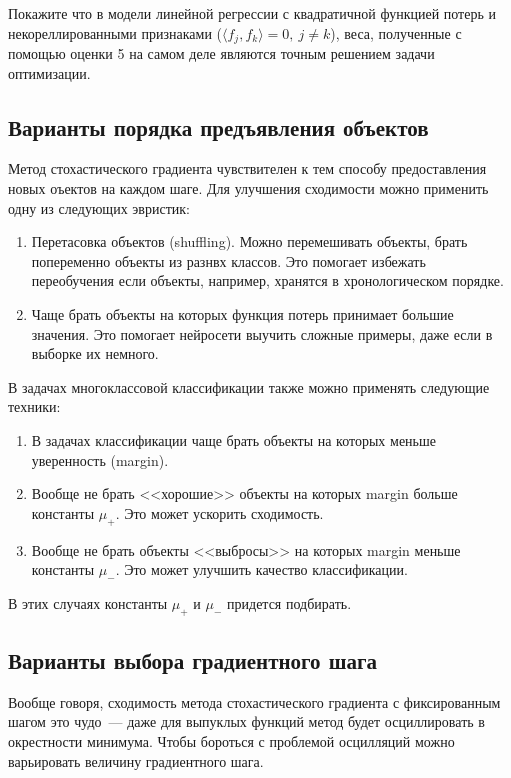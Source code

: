 \begin{problem}
Покажите что в модели линейной регрессии с квадратичной функцией потерь и некореллированными признаками ($\langle f_j, f_k \rangle = 0,\ j \neq k$), веса, полученные с помощью оценки 5 на самом деле являются точным решением задачи оптимизации.
\end{problem}

\subsection{Варианты порядка предъявления объектов}

Метод стохастического градиента чувствителен к тем способу предоставления новых оъектов на каждом шаге. Для улучшения сходимости можно применить одну из следующих эвристик:

\begin{enumerate}
	\item Перетасовка объектов (shuffling). Можно перемешивать объекты, брать попеременно объекты из разнвх классов. Это помогает избежать переобучения если объекты, например, хранятся в хронологическом порядке.
	\item Чаще брать объекты на которых функция потерь принимает большие значения. Это помогает нейросети выучить сложные примеры, даже если в выборке их немного.
\end{enumerate}

В задачах многоклассовой классификации также можно применять следующие техники:
\begin{enumerate}
	\item В задачах классификации чаще брать объекты на которых меньше уверенность (margin).
	\item Вообще не брать <<хорошие>> объекты на которых margin больше константы $\mu_+$. Это может ускорить сходимость.
	\item Вообще не брать объекты <<выбросы>> на которых margin меньше константы $\mu_-$. Это может улучшить качество классификации.
\end{enumerate}
В этих случаях константы $\mu_+$ и $\mu_-$ придется подбирать.

\subsection{Варианты выбора градиентного шага}

Вообще говоря, сходимость метода стохастического градиента с фиксированным шагом это чудо~--- даже для выпуклых функций метод будет осциллировать в окрестности минимума. Чтобы бороться с проблемой осцилляций можно варьировать величину градиентного шага.

